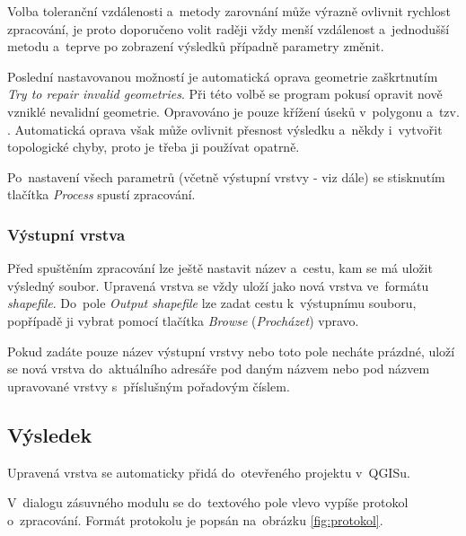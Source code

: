 Volba toleranční vzdálenosti a~metody zarovnání může výrazně ovlivnit rychlost 
zpracování, je proto doporučeno volit raději vždy menší vzdálenost a~jednodušší
metodu a~teprve po zobrazení výsledků případně parametry změnit.

Poslední nastavovanou možností je automatická oprava geometrie zaškrtnutím 
\textit{Try to repair invalid geometries}. Při této volbě se program pokusí
opravit nově vzniklé nevalidní geometrie. Opravováno je pouze křížení úseků
v~polygonu a~tzv. . Automatická oprava však může ovlivnit
přesnost výsledku a~někdy i~vytvořit topologické chyby, proto je třeba ji
používat opatrně.

Po~nastavení všech parametrů (včetně výstupní vrstvy - viz dále) se stisknutím 
tlačítka \textit{Process} spustí zpracování. 

\subsubsection{Výstupní vrstva}

Před spuštěním zpracování lze ještě nastavit název a~cestu, kam se má uložit
výsledný soubor. Upravená vrstva se vždy uloží jako nová vrstva ve~formátu 
\textit{shapefile}. Do~pole \textit{Output shapefile} lze zadat cestu k~výstupnímu
souboru, popřípadě ji vybrat pomocí tlačítka \textit{Browse} (\textit{Procházet})
vpravo. 

Pokud zadáte pouze název výstupní vrstvy nebo toto pole necháte prázdné, 
uloží se nová vrstva do~aktuálního adresáře pod daným názvem nebo pod názvem
upravované vrstvy s~příslušným pořadovým číslem. 

\subsection{Výsledek}
\label{prirucka-vysledek}

Upravená vrstva se automaticky přidá do~otevřeného projektu v~QGISu.

V~dialogu zásuvného modulu se do~textového pole vlevo vypíše protokol o~zpracování.
Formát protokolu je popsán na~obrázku \ref{fig:protokol}.  

